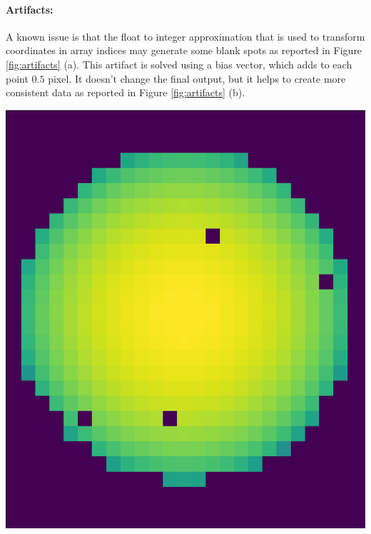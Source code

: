 \documentclass{article}
\begin{document}
\paragraph{Artifacts:} A known issue is that the float to integer approximation that is used to transform coordinates in array indices may generate some blank spots as reported in Figure \ref{fig:artifacts} (a).
This artifact is solved using a bias vector, which adds to each point $0.5$ pixel. It doesn't change the final output, but it helps to create more consistent data as reported in Figure \ref{fig:artifacts} (b).
\begin{center}
    \begin{minipage}{0.45\textwidth}
        \includegraphics*[width=\linewidth]{../images/artifact_ON.png}
    \end{minipage}
    \hfill
    \begin{minipage}{0.45\textwidth}

\end{minipage}
\end{center}
\end{document}
